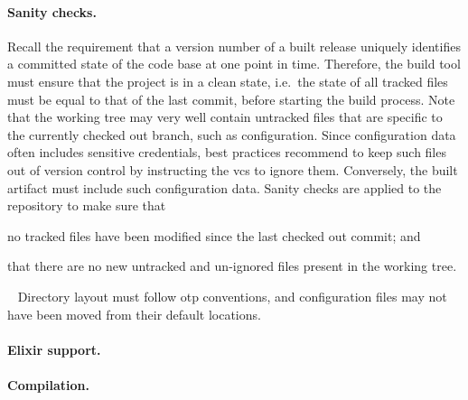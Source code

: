\paragraph{Sanity checks.} Recall the requirement that a version number of a built release uniquely identifies a committed state of the code base at one point in time. Therefore, the build tool must ensure that the project is in a clean state, i.e.~the state of all tracked files must be equal to that of the last commit, before starting the build process. Note that the working tree may very well contain untracked files that are specific to the currently checked out branch, such as configuration. Since configuration data often includes sensitive credentials, best practices recommend to keep such files out of version control by instructing the \acrshort{vcs} to ignore them. Conversely, the built artifact must include such configuration data. Sanity checks are applied to the repository to make sure that \begin{enumerate*}[label=(\roman*)]
  \item no tracked files have been modified since the last checked out commit; and
  \item that there are no new untracked and un-ignored files present in the working tree.
\end{enumerate*}~\cite{man:git}
Directory layout must follow \acrshort{otp} conventions, and configuration files may not have been moved from their default locations.

\paragraph{Elixir support.}


\paragraph{Compilation.}

